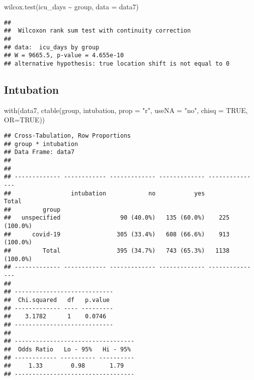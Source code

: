 \documentclass[
]{article}
\newenvironment{Shaded}{\begin{snugshade}}{\end{snugshade}}
\newcommand{\AttributeTok}[1]{\textcolor[rgb]{0.77,0.63,0.00}{#1}}
\newcommand{\ConstantTok}[1]{\textcolor[rgb]{0.00,0.00,0.00}{#1}}
\newcommand{\FunctionTok}[1]{\textcolor[rgb]{0.00,0.00,0.00}{#1}}
\newcommand{\NormalTok}[1]{#1}
\newcommand{\SpecialCharTok}[1]{\textcolor[rgb]{0.00,0.00,0.00}{#1}}
\newcommand{\StringTok}[1]{\textcolor[rgb]{0.31,0.60,0.02}{#1}}
\begin{document}
\begin{Shaded}
\begin{Highlighting}[]
\FunctionTok{wilcox.test}\NormalTok{(icu\_days }\SpecialCharTok{\textasciitilde{}}\NormalTok{ group, }\AttributeTok{data =}\NormalTok{ data7)}
\end{Highlighting}
\end{Shaded}

\begin{verbatim}
## 
##  Wilcoxon rank sum test with continuity correction
## 
## data:  icu_days by group
## W = 9665.5, p-value = 4.655e-10
## alternative hypothesis: true location shift is not equal to 0
\end{verbatim}

\hypertarget{intubation}{%
\subsection{Intubation}\label{intubation}}

\begin{Shaded}
\begin{Highlighting}[]
\FunctionTok{with}\NormalTok{(data7, }\FunctionTok{ctable}\NormalTok{(group, intubation, }\AttributeTok{prop =} \StringTok{"r"}\NormalTok{, }\AttributeTok{useNA =} \StringTok{"no"}\NormalTok{, }\AttributeTok{chisq =} \ConstantTok{TRUE}\NormalTok{, }\AttributeTok{OR=}\ConstantTok{TRUE}\NormalTok{))}
\end{Highlighting}
\end{Shaded}

\begin{verbatim}
## Cross-Tabulation, Row Proportions  
## group * intubation  
## Data Frame: data7  
## 
## 
## ------------- ------------ ------------- ------------- ---------------
##                 intubation            no           yes           Total
##         group                                                         
##   unspecified                 90 (40.0%)   135 (60.0%)    225 (100.0%)
##      covid-19                305 (33.4%)   608 (66.6%)    913 (100.0%)
##         Total                395 (34.7%)   743 (65.3%)   1138 (100.0%)
## ------------- ------------ ------------- ------------- ---------------
## 
## ----------------------------
##  Chi.squared   df   p.value 
## ------------- ---- ---------
##    3.1782      1    0.0746  
## ----------------------------
## 
## ----------------------------------
##  Odds Ratio   Lo - 95%   Hi - 95% 
## ------------ ---------- ----------
##     1.33        0.98       1.79   
## ----------------------------------
\end{verbatim}
\end{document}
